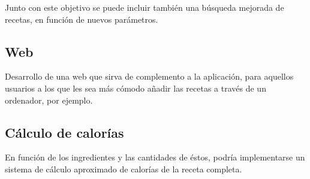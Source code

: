 \documentclass[a4paper,11pt]{article}
\begin{document}
Junto con este objetivo se puede incluir también una búsqueda mejorada de recetas, en función de nuevos parámetros.


\subsection{Web}

Desarrollo de una web que sirva de complemento a la aplicación, para aquellos usuarios a los que les sea más cómodo añadir las recetas a través de un ordenador, por ejemplo.

\subsection{Cálculo de calorías}

En función de los ingredientes y las cantidades de éstos, podría implementarse un sistema de cálculo aproximado de calorías de la receta completa.
\end{document}
